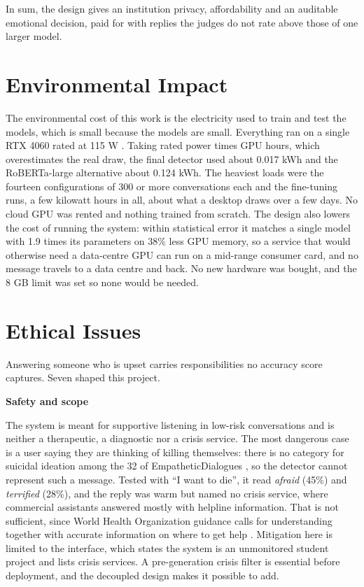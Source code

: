 In sum, the design gives an institution privacy, affordability and an auditable emotional decision, paid for with replies the judges do not rate above those of one larger model.

\section{Environmental Impact}
\label{sec:3.3}

The environmental cost of this work is the electricity used to train and test the models, which is small because the models are small. Everything ran on a single RTX 4060 rated at 115 W \cite{nvidia_rtx4060}. Taking rated power times GPU hours, which overestimates the real draw, the final detector used about 0.017 kWh and the RoBERTa-large alternative about 0.124 kWh. The heaviest loads were the fourteen configurations of 300 or more conversations each and the fine-tuning runs, a few kilowatt hours in all, about what a desktop draws over a few days. No cloud GPU was rented and nothing trained from scratch. The design also lowers the cost of running the system: within statistical error it matches a single model with 1.9 times its parameters on 38\% less GPU memory, so a service that would otherwise need a data-centre GPU can run on a mid-range consumer card, and no message travels to a data centre and back. No new hardware was bought, and the 8 GB limit was set so none would be needed.

\section{Ethical Issues}
\label{sec:3.4}

Answering someone who is upset carries responsibilities no accuracy score captures. Seven shaped this project.

\textbf{Safety and scope}

The system is meant for supportive listening in low-risk conversations and is neither a therapeutic, a diagnostic nor a crisis service. The most dangerous case is a user saying they are thinking of killing themselves: there is no category for suicidal ideation among the 32 of EmpatheticDialogues \cite{rashkin2019}, so the detector cannot represent such a message. Tested with ``I want to die'', it read \textit{afraid }(45\%) and \textit{terrified }(28\%), and the reply was warm but named no crisis service, where commercial assistants answered mostly with helpline information. That is not sufficient, since World Health Organization guidance calls for understanding together with accurate information on where to get help \cite{who2023suicide}. Mitigation here is limited to the interface, which states the system is an unmonitored student project and lists crisis services. A pre-generation crisis filter is essential before deployment, and the decoupled design makes it possible to add.

